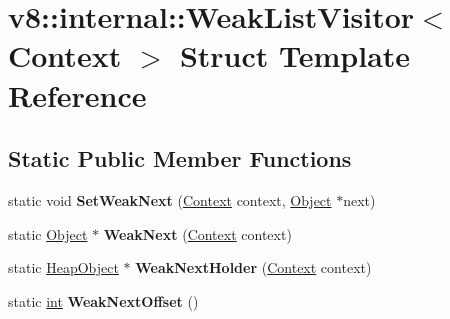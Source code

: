 \hypertarget{structv8_1_1internal_1_1WeakListVisitor_3_01Context_01_4}{}\section{v8\+:\+:internal\+:\+:Weak\+List\+Visitor$<$ Context $>$ Struct Template Reference}
\label{structv8_1_1internal_1_1WeakListVisitor_3_01Context_01_4}
\subsection*{Static Public Member Functions}
\begin{DoxyCompactItemize}
\item 
\mbox{\label{structv8_1_1internal_1_1WeakListVisitor_3_01Context_01_4_aa6e511683d53ff12a8daa2f8e9e6a79c}} 
static void {\bfseries Set\+Weak\+Next} (\mbox{\hyperlink{classv8_1_1internal_1_1Context}{Context}} context, \mbox{\hyperlink{classv8_1_1internal_1_1Object}{Object}} $\ast$next)
\item 
\mbox{\label{structv8_1_1internal_1_1WeakListVisitor_3_01Context_01_4_afe26926109ad55d42868ef719fd20d15}} 
static \mbox{\hyperlink{classv8_1_1internal_1_1Object}{Object}} $\ast$ {\bfseries Weak\+Next} (\mbox{\hyperlink{classv8_1_1internal_1_1Context}{Context}} context)
\item 
\mbox{\label{structv8_1_1internal_1_1WeakListVisitor_3_01Context_01_4_afb0d7e986247dd65d80be6d9cbc2485c}} 
static \mbox{\hyperlink{classv8_1_1internal_1_1HeapObject}{Heap\+Object}} $\ast$ {\bfseries Weak\+Next\+Holder} (\mbox{\hyperlink{classv8_1_1internal_1_1Context}{Context}} context)
\item 
\mbox{\label{structv8_1_1internal_1_1WeakListVisitor_3_01Context_01_4_a1151b6139cd58c988d50855aebdbb729}} 
static \mbox{\hyperlink{classint}{int}} {\bfseries Weak\+Next\+Offset} ()
\item 
\mbox{\label{structv8_1_1internal_1_1WeakListVisitor_3_01Context_01_4_ae2ea7fc4db3f08bd3a2d0b8dd8067cc7}} 

\end{DoxyCompactItemize}
